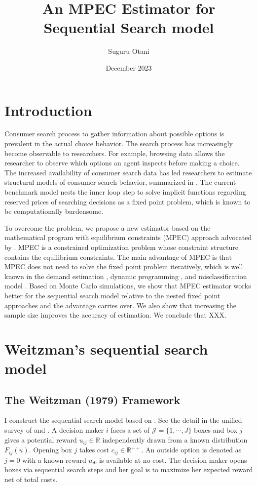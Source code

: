 \documentclass[12pt]{article}
\title{An MPEC Estimator for Sequential Search model}
\author{Suguru Otani}
\date{December 2023}
\begin{document}
\maketitle

\section{Introduction}

Consumer search process to gather information about possible options is prevalent in the actual choice behavior.
The search process has increasingly become observable to researchers. 
For example, browsing data allows the researcher to observe which options an agent inspects before making a choice. 
The increased availability of consumer search data has led researchers to estimate structural models of consumer search behavior, summarized in \cite{ursu2023sequential}. 
The current benchmark model nests the inner loop step to solve implicit functions regarding reserved prices of searching decisions as a fixed point problem, which is known to be computationally burdensome.

To overcome the problem, we propose a new estimator based on the mathematical program
with equilibrium constraints (MPEC) approach advocated by \cite{su2012constrained}. 
MPEC is a constrained optimization problem whose constraint structure contains the equilibrium constraints.
The main advantage of MPEC is that MPEC does not need to solve the fixed point problem iteratively, which is well known in the demand estimation \citep{dube2012improving}, dynamic programming \citep{su2012constrained,egesdal2015estimating}, and misclassification model \citep{lu2014mpec}.
Based on Monte Carlo simulations, we show that MPEC estimator works better for the sequential search model relative to the nested fixed point approaches and the advantage carries over. 
We also show that increasing the sample size improves the accuracy of estimation. 
We conclude that XXX.

\section{Weitzman's sequential search model}

\subsection{The Weitzman (1979) Framework}
I construct the sequential
search model based on \cite{weitzman1979optimal}.
See the detail in the unified survey of \cite{ursu2023sequential} and \cite{honka2019empirical}. 
A decision maker $i$ faces a set of $\mathcal{J}=\{1,\cdots,J\}$ boxes and box $j$ gives a potential reward $u_{ij}\in \mathbb{R}$ independently drawn from a known
distribution $F_{ij}(u)$.
Opening box $j$ takes cost $c_{ij}\in \mathbb{R}^{++}$. 
An outside option is denoted as $j = 0$ with a known reward $u_{i0}$ is available at no cost.
The decision maker
opens boxes via sequential search steps and her goal is to maximize her expected reward net of total costs.
\end{document}
